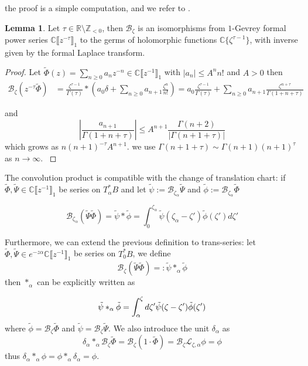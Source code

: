 \documentclass{article}
\theoremstyle{definition}
\newcommand{\Z}{\mathbb{Z}}
\newcommand{\C}{\mathbb{C}}
\newcommand{\series}[1]{\tilde{#1}}
\newcommand{\laplace}{\mathcal{L}}
\newcommand{\borel}{\mathcal{B}}
\newtheorem{lemma}[definition]{Lemma}
\newenvironment{verify}{\color{ForestGreen}}{\color{black}}
\begin{document}
the proof is a simple computation, and we refer to  \cite[Definition 5.12 and Lemma 5.14]{diverg-resurg-i}.
\begin{lemma}
    Let $\tau\in\mathbb{R}\setminus\Z_{<0}$, then $\borel_\zeta$ is an isomorphisms from $1$-Gevrey formal power series $\C \llbracket z^{-\tau} \rrbracket_1$ to the germs of holomorphic functions $\C \lbrace \zeta^{\tau-1} \rbrace$, with inverse given by the formal Laplace transform.
\end{lemma}
\begin{proof}
    Let $\tilde{\Phi}(z)=\sum_{n\geq 0}a_nz^{-n}\in\C \llbracket z^{-1} \rrbracket_1$ with $|a_n|\leq A^n n!$ and $A>0$ then  
\begin{align*}
\borel_\zeta (z^{-\tau}\tilde{\Phi})&=\frac{\zeta^{\tau-1}}{\Gamma(\tau)}\ast\left(a_0\delta+\sum_{n\geq 0}a_{n+1}\frac{\zeta^n}{n!}\right)=a_0\frac{\zeta^{\tau-1}}{\Gamma(\tau)}+\sum_{n\geq 0}a_{n+1}\frac{\zeta^{n+\tau}}{\Gamma(1+n+\tau)}
\end{align*}  

and \[\left|\frac{a_{n+1}}{\Gamma(1+n+\tau)}\right|\leq A^{n+1}\frac{\Gamma(n+2)}{|\Gamma(n+1+\tau)|} \]
which grows as $n(n+1)^{-\tau} A^{n+1}$.
\begin{verify}
    we use $\Gamma(n+1+\tau)\sim \Gamma(n+1) (n+1)^\tau$ as $n\to\infty$. 
\end{verify}
\end{proof}


The convolution product is compatible with the change of translation chart: if $\tilde{\Phi}, \tilde{\Psi}\in \C \llbracket z^{-1} \rrbracket_1$ be series on $T^*_\alpha B$ and let $\series{\psi}:=\borel_{\zeta_\alpha}\series{\Psi}$ and $\series{\phi}:=\borel_{\zeta_\alpha}\series{\Phi}$

\[\borel_{\zeta_\alpha}(\series{\Psi}\series{\Phi})=\series{\psi}\ast \series{\phi}=\int_{0}^{\zeta_\alpha}\series{\psi}(\zeta_\alpha-\zeta')\series{\phi}(\zeta')d\zeta'\]

Furthermore, we can extend the previous definition to trans-series: let $\tilde{\Phi}, \tilde{\Psi}\in e^{-z\alpha}\C \llbracket z^{-1} \rrbracket_1$ be series on $T^*_0 B$, we define  \[\borel_{\zeta}(\series{\Psi}\series{\Phi})=:\series{\psi}\ast_\alpha\series{\phi}\]
then $\ast_\alpha$ can be explicitly written as 

\begin{equation}
    \tilde{\psi}\ast_\alpha\Tilde{\phi}=\int_\alpha^{\zeta}d\zeta' \tilde{\psi}(\zeta-\zeta')\tilde{\phi}(\zeta')
\end{equation}
where $\series{\phi}=\borel_\zeta\series{\Phi}$ and $\series{\psi}=\borel_\zeta\series{\Psi}$. We also introduce the unit $\delta_\alpha$ as \[\delta_\alpha\ast_\alpha\borel_\zeta\series{\Phi}=\borel_\zeta(1\cdot\series{\Phi})=\borel_\zeta\laplace_{\zeta,\alpha}\phi=\phi\]
thus $\delta_\alpha\ast_\alpha\phi=\phi\ast_\alpha\delta_\alpha=\phi$. 
\end{document}
